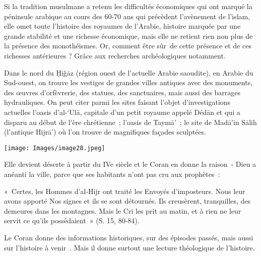 Si la tradition musulmane a retenu les difficultés économiques qui ont
marqué la péninsule arabique au cours des 60-70 ans qui précèdent
l'avènement de l'islam, elle omet toute l'histoire des royaumes de
l'Arabie, histoire marquée par une grande stabilité et une richesse
économique, mais elle ne retient rien non plus de la présence des
monothéismes. Or, comment être sûr~de cette présence et de ces richesses
antérieures ? Grâce aux recherches archéologiques notamment.


Dans le nord du Ḥiǧāz (région ouest de l'actuelle Arabie saoudite), en
Arabie du Sud-ouest, on trouve les vestiges de grandes villes antiques
avec des monuments, des œuvres d'orfèvrerie, des statues, des
sanctuaires, mais aussi des barrages hydrauliques. On peut citer parmi
les sites faisant l'objet d'investigations actuelles l'oasis d'al-`Ulā,
capitale d'un petit royaume appelé Dédān et qui a disparu au début de
l'ère chrétienne~; l'oasis de Taymā'~; le site de Madā'in Sālih
(l'antique Hijrā') où l'on trouve de magnifiques façades sculptées.

\texttt{[image: Images/image28.jpeg]}

Elle devient déserte à partir du IVe siècle et le Coran en donne la
raison~- Dieu a anéanti la ville, parce que ses habitants n'ont pas cru
aux prophètes~:

«~Certes, les Hommes d'al-Hijr ont traité les Envoyés d'imposteurs. Nous
leur avons apporté Nos signes et ils se sont détournés. Ils creusèrent,
tranquilles, des demeures dans les montagnes. Mais le Cri les prit au
matin, et à rien ne leur servit ce qu'ils possédaient~» (S. 15,
80-84).


\begin{Def}
Le Coran donne des informations
historiques, sur des épisodes passés, mais aussi sur l'histoire à
venir~. Mais il donne
surtout une lecture théologique de l'histoire.
\end{Def}

